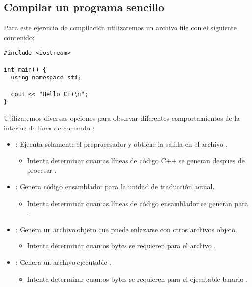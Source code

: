 \subsection{Compilar un programa sencillo}

Para este ejercicio de compilación utilizaremos un archivo  file 
con el siguiente contenido:

\begin{lstlisting}
#include <iostream>

int main() {
  using namespace std;

  cout << "Hello C++\n";
}
\end{lstlisting}

Utilizaremos diversas opciones para observar diferentes comportamientos de la interfaz de línea de comando
:

\begin{itemize}
  \item {}: 
  Ejecuta solamente el preprocesador y obtiene la salida en el archivo .
    \begin{itemize}
      \item Intenta determinar cuantas líneas de código C++ se generan despues de procesar .
    \end{itemize}

  \item {}:
  Genera código ensamblador para la unidad de traducción actual.
    \begin{itemize}
      \item Intenta determinar cuantas líneas de código ensamblador se generan para .
    \end{itemize}

  \item {}:
  Genera un archivo objeto  que puede enlazarse con otros archivos objeto.
    \begin{itemize}
      \item Intenta determinar cuantos bytes se requieren para el archivo .
    \end{itemize}

  \item {}:
  Genera un archivo ejecutable .
    \begin{itemize}
      \item Intenta determinar cuantos bytes se requieren para el ejecutable binario .
    \end{itemize}
\end{itemize}

